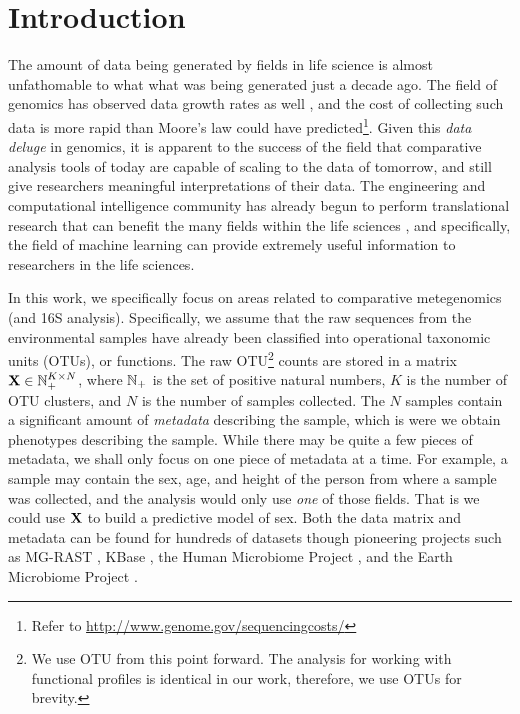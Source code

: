 \documentclass{acm_proc_article-sp}
\begin{document}
\section{Introduction}

The amount of data being generated by fields in life science is almost unfathomable to what what was being  generated just a decade ago. The field of genomics has observed data growth rates as well \cite{BigDataBook}, and the cost of collecting such data is more rapid than Moore's law could have predicted\footnote{Refer to \url{http://www.genome.gov/sequencingcosts/}}. Given this {\em data deluge} in genomics, it is apparent to the success of the field that comparative analysis tools of today are capable of scaling to the data of tomorrow, and still give researchers meaningful interpretations of their data. The engineering and computational intelligence community has already begun to perform translational research that can benefit the many fields within the life sciences \cite{Vidyasagar2012CSM}, and specifically, the field of machine learning can provide extremely useful information to researchers in the life sciences. 


In this work, we specifically focus on areas related to comparative metegenomics (and 16S analysis). Specifically, we assume that the raw sequences from the environmental samples have already been classified into operational taxonomic units (OTUs), or functions. The raw OTU\footnote{We use OTU from this point forward. The analysis for working with functional profiles is identical in our work, therefore, we use OTUs for brevity.} counts are stored in a  matrix ${\mathbf X} \in {\mathbb N}_{+}^{K \times N}$, where ${\mathbb N}_{+}$ is the set of positive natural numbers, $K$ is the number of OTU clusters, and $N$ is the number of samples collected. The $N$ samples contain a significant amount of {\em metadata} describing the sample, which is were we obtain phenotypes describing the sample. While there may be quite a few pieces of metadata, we shall only focus on one piece of metadata at a time. For example, a sample may contain the sex, age, and height of the person from where a sample was collected, and the analysis would only use {\em one} of those fields. That is we could use ${\mathbf X}$ to build a predictive model of sex. Both the data matrix and metadata can be found for hundreds of datasets though pioneering projects such as MG-RAST \cite{Meyer2008BMCBio}, KBase \cite{KBase}, the Human Microbiome Project \cite{HMP2009}, and the Earth Microbiome Project \cite{Gilbert2010SGS}.  
\end{document}
